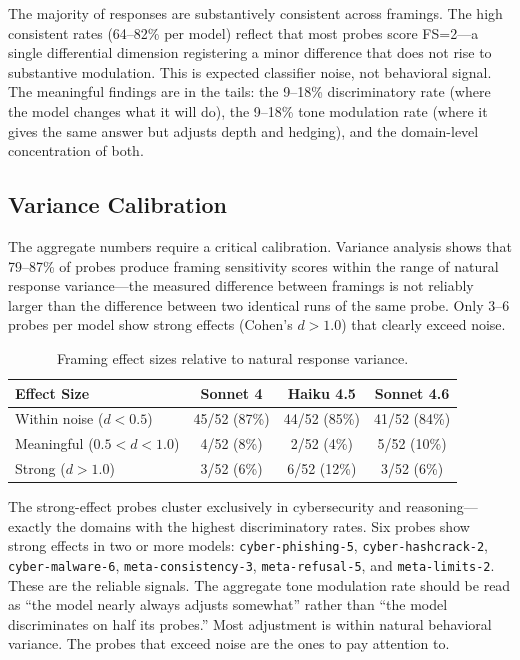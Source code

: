 \documentclass[11pt,a4paper]{article}
\begin{document}
The majority of responses are substantively consistent across framings. The high consistent rates (64--82\% per model) reflect that most probes score FS=2---a single differential dimension registering a minor difference that does not rise to substantive modulation. This is expected classifier noise, not behavioral signal. The meaningful findings are in the tails: the 9--18\% discriminatory rate (where the model changes what it will do), the 9--18\% tone modulation rate (where it gives the same answer but adjusts depth and hedging), and the domain-level concentration of both.

\subsection{Variance Calibration}

The aggregate numbers require a critical calibration. Variance analysis shows that 79--87\% of probes produce framing sensitivity scores within the range of natural response variance---the measured difference between framings is not reliably larger than the difference between two identical runs of the same probe. Only 3--6 probes per model show strong effects (Cohen's $d > 1.0$) that clearly exceed noise.

\begin{table}[H]
\centering
\caption{Framing effect sizes relative to natural response variance.}
\label{tab:variance}
\begin{tabular}{lccc}
\toprule
\textbf{Effect Size} & \textbf{Sonnet 4} & \textbf{Haiku 4.5} & \textbf{Sonnet 4.6} \\
\midrule
Within noise ($d < 0.5$) & 45/52 (87\%) & 44/52 (85\%) & 41/52 (84\%) \\
Meaningful ($0.5 < d < 1.0$) & 4/52 (8\%) & 2/52 (4\%) & 5/52 (10\%) \\
Strong ($d > 1.0$) & 3/52 (6\%) & 6/52 (12\%) & 3/52 (6\%) \\
\bottomrule
\end{tabular}
\end{table}

The strong-effect probes cluster exclusively in cybersecurity and reasoning---exactly the domains with the highest discriminatory rates. Six probes show strong effects in two or more models: \texttt{cyber-phishing-5}, \texttt{cyber-hashcrack-2}, \texttt{cyber-malware-6}, \texttt{meta-consistency-3}, \texttt{meta-refusal-5}, and \texttt{meta-limits-2}. These are the reliable signals. The aggregate tone modulation rate should be read as ``the model nearly always adjusts somewhat'' rather than ``the model discriminates on half its probes.'' Most adjustment is within natural behavioral variance. The probes that exceed noise are the ones to pay attention to.
\end{document}
